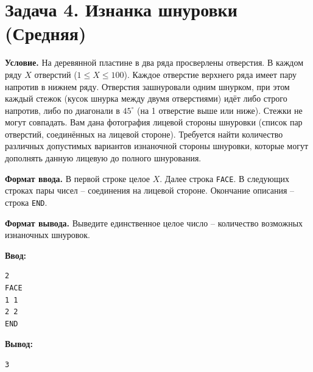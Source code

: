 \section*{Задача 4. Изнанка шнуровки (Средняя)}
\textbf{Условие.} На деревянной пластине в два ряда просверлены отверстия. В каждом ряду $X$ отверстий ($1 \le X \le 100$). Каждое отверстие верхнего ряда имеет пару напротив в нижнем ряду. Отверстия зашнуровали одним шнурком, при этом каждый стежок (кусок шнурка между двумя отверстиями) идёт либо строго напротив, либо по диагонали в $45^\circ$ (на 1 отверстие выше или ниже). Стежки не могут совпадать. Вам дана фотография лицевой стороны шнуровки (список пар отверстий, соединённых на лицевой стороне). Требуется найти количество различных допустимых вариантов изнаночной стороны шнуровки, которые могут дополнять данную лицевую до полного шнурования.

\textbf{Формат ввода.} В первой строке целое $X$. Далее строка \texttt{FACE}. В следующих строках пары чисел -- соединения на лицевой стороне. Окончание описания -- строка \texttt{END}.

\textbf{Формат вывода.} Выведите единственное целое число -- количество возможных изнаночных шнуровок.

\begin{examplebox}
  \begin{minipage}[t]{0.48\linewidth}
    \textbf{Ввод:}\\
    \begin{verbatim}
2
FACE
1 1
2 2
END
    \end{verbatim}
  \end{minipage}%
  \hfill%
  \begin{minipage}[t]{0.48\linewidth}
    \textbf{Вывод:}\\
    \begin{verbatim}
3
    \end{verbatim}
  \end{minipage}
\end{examplebox}